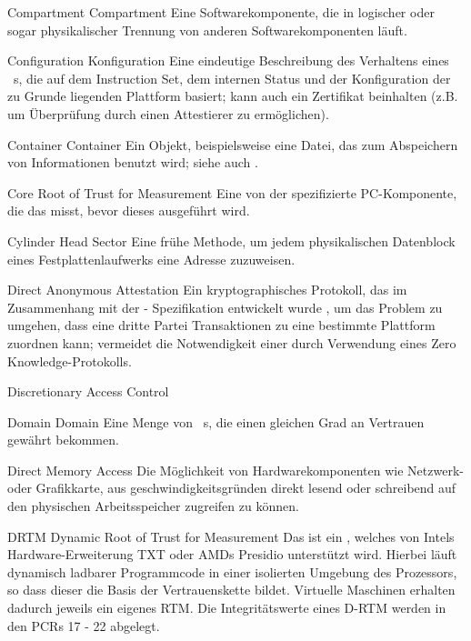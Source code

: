 \glosentry
          {Compartment}
          {Compartment}
    {Eine Softwarekomponente, die in logischer oder sogar physikalischer
     Trennung von anderen Softwarekomponenten l\"auft.}

\glosentry
          {Configuration}
          {Konfiguration}
    {Eine eindeutige Beschreibung des Verhaltens eines \Compartment~s,
     die auf dem Instruction Set, dem internen Status und der Konfiguration
     der zu Grunde liegenden Plattform basiert; kann auch ein Zertifikat
     beinhalten (z.B. um \"Uberpr\"ufung durch einen Attestierer zu erm\"oglichen).}

\glosentry
          {Container}
          {Container}
    {Ein Objekt, beispielsweise eine Datei, das zum Abspeichern von
     Informationen benutzt wird; siehe auch \SecureContainer.}

          {Core Root of Trust for Measurement}
    {Eine von der \TCG spezifizierte PC-Komponente, die das \BIOS misst,
     bevor dieses ausgef\"uhrt wird.}

          {Cylinder Head Sector}
    {Eine fr\"uhe Methode, um jedem physikalischen Datenblock eines
     Festplattenlaufwerks eine Adresse zuzuweisen.}

          {Direct Anonymous Attestation}
    {Ein kryptographisches Protokoll, das im Zusammenhang mit der \TCG-
     Spezifikation entwickelt wurde \cite{BrCaCh2004}, um das Problem zu
     umgehen, dass eine dritte Partei Transaktionen zu eine bestimmte
     Plattform zuordnen kann; vermeidet die Notwendigkeit einer \PrivacyCA
     durch Verwendung eines Zero Knowledge-Protokolls.}

     {Discretionary Access Control}

\glosentry
          {Domain}
          {Domain}
    {Eine Menge von \Compartment~s, die einen gleichen Grad an Vertrauen
     gew\"ahrt bekommen.}

	{Direct Memory Access}
	{Die Möglichkeit von Hardwarekomponenten wie Netzwerk- oder Grafikkarte, aus geschwindigkeitsgründen direkt lesend oder schreibend auf den physischen Arbeitsspeicher zugreifen zu können.}

\glosentry
          {DRTM}
          {Dynamic Root of Trust for Measurement}
    {Das \drtm ist ein \RTM, welches von Intels Hardware-Erweiterung TXT oder AMDs Presidio unterst\"utzt wird. Hierbei l\"auft dynamisch ladbarer Programmcode in einer isolierten Umgebung des Prozessors, so dass dieser die Basis der Vertrauenskette bildet. Virtuelle Maschinen erhalten dadurch jeweils ein eigenes RTM. Die Integrit\"atswerte eines D-RTM werden in den PCRs 17 - 22 abgelegt.}

